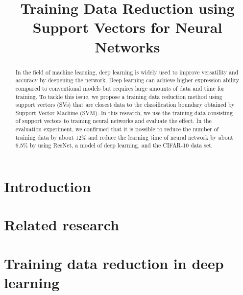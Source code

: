 \documentclass[conference,a4paper]{APSIPA2018}
\begin{document}
\title{Training Data Reduction using Support Vectors for Neural Networks}

\author{%
%
%
%
}


\maketitle
\thispagestyle{empty}

\begin{abstract}
  In the field of machine learning, deep learning is widely used to 
improve versatility and accuracy by deepening the network. Deep learning 
can achieve higher expression ability compared to conventional models 
but requires large amounts of data and time for training. To tackle this 
issue, we propose a training data reduction method using support vectors 
(SVs) that are closest data to the classification boundary obtained by 
Support Vector Machine (SVM). In this research, we use the training data 
consisting of support vectors to training neural networks and evaluate 
the effect. In the evaluation experiment, we confirmed that it is 
possible to reduce the number of training data by about 12\% and reduce 
the learning time of neural network by about 9.5\% by using ResNet, a 
model of deep learning, and the CIFAR-10 data set.
\end{abstract}

\section{Introduction}



\section{Related research}


\section{Training data reduction in deep learning}


\end{document}
